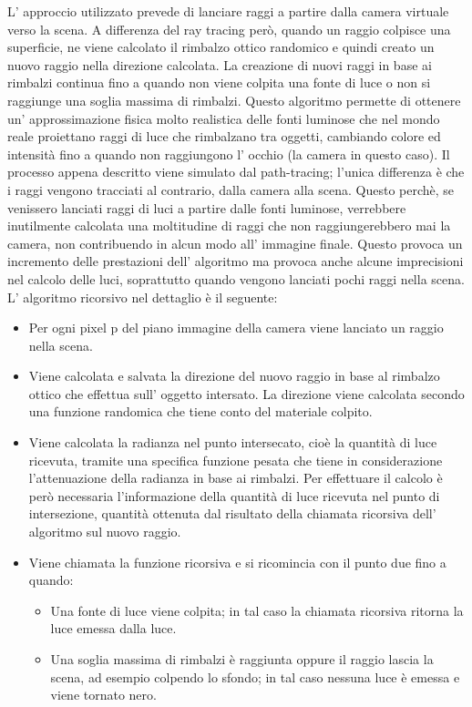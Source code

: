L’ approccio utilizzato prevede di lanciare raggi a partire dalla camera virtuale verso la scena. 
A differenza del ray tracing però, quando un raggio colpisce una superficie, ne viene calcolato il rimbalzo ottico randomico e quindi creato un  nuovo raggio nella direzione calcolata. 
La creazione di nuovi raggi in base ai rimbalzi continua fino a quando non viene colpita una fonte di luce o non si raggiunge una soglia massima di rimbalzi.
Questo algoritmo permette di ottenere un’ approssimazione fisica molto realistica delle fonti luminose che nel mondo reale  proiettano raggi di luce che rimbalzano tra oggetti, cambiando colore ed intensità fino a quando non raggiungono l’ occhio (la camera in questo caso). 
Il processo appena descritto viene simulato dal path-tracing; l’unica differenza è che i raggi vengono tracciati al contrario, dalla camera alla scena. Questo perchè, se venissero lanciati raggi di luci a partire dalle fonti luminose, verrebbere inutilmente calcolata una moltitudine di raggi che non raggiungerebbero mai la camera, non contribuendo in alcun modo all’ immagine finale.
Questo provoca un incremento delle prestazioni dell’ algoritmo ma provoca anche alcune imprecisioni nel calcolo delle luci, soprattutto quando vengono lanciati pochi raggi nella scena. 
L’ algoritmo ricorsivo nel dettaglio è il seguente:
\begin{itemize}
\item Per ogni pixel p del piano immagine della camera viene lanciato un raggio nella scena.
\item Viene calcolata e salvata la direzione del nuovo raggio in base al rimbalzo ottico che effettua sull’ oggetto intersato. La direzione viene calcolata secondo una funzione randomica che tiene conto del materiale colpito.
\item Viene calcolata la radianza nel punto intersecato, cioè la quantità di luce ricevuta,  tramite una specifica funzione pesata che tiene in considerazione l’attenuazione della radianza in base ai rimbalzi. Per effettuare il calcolo è però necessaria l’informazione della quantità di luce ricevuta nel punto di intersezione, quantità ottenuta dal risultato della chiamata ricorsiva dell’ algoritmo sul nuovo raggio.
\item Viene chiamata la funzione ricorsiva e si ricomincia con il punto due fino a quando:
\begin{itemize}
\item Una fonte di luce viene colpita; in tal caso la chiamata ricorsiva ritorna la luce emessa dalla luce.
\item Una soglia massima di rimbalzi è raggiunta oppure il raggio lascia la scena, ad esempio colpendo lo sfondo; in tal caso nessuna luce è emessa e viene tornato nero.
\end{itemize}
\end{itemize}

